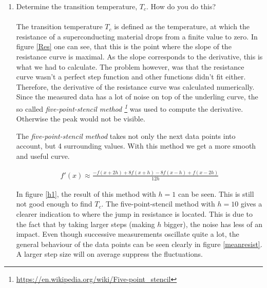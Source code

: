 \documentclass[a4paper,parskip,11pt, DIV12]{scrreprt}
\begin{document}
\begin{enumerate}
\hspace{0.1pt}

\item Determine the transition temperature, $T_c$. How do you do this?\\
\\
The transition temperature $T_c$ is defined as the temperature, at which the resistance of a superconducting material drops from a finite value to zero. In figure \ref{Res} one can see, that this is the point where the slope of the resistance curve is maximal. As the slope corresponds to the derivative, this is what we had to calculate.  The problem however, was that the resistance curve wasn't a perfect step function and other functions didn't fit either. Therefore, the derivative of the resistance curve was calculated numerically. Since the measured data has a lot of noise on top of the underling curve, the so called \emph{five-point-stencil method \footnote{\url{https://en.wikipedia.org/wiki/Five-point_stencil}}} was used to compute the derivative. Otherwise the peak would not be visible.

The \emph{five-point-stencil method} takes not only the next data points into account, but 4 surrounding values. With this method we get a more smooth and useful curve. 

\begin{align*}
f'(x) \approx \frac{-f(x+2 h)+8 f(x+h)-8 f(x-h)+f(x-2h)}{12 h}
\end{align*}

In figure \ref{h1}, the result of this method with $h = 1$ can be seen. This is still not good enough to find $T_c$. The five-point-stencil method with $h = 10$ gives a clearer indication to where the jump in resistance is located. This is due to the fact that by taking larger steps (making $h$ bigger), the noise has less of an impact. Even though successive measurements oscillate quite a lot, the general behaviour of the data points can be seen clearly in figure \ref{meanresist}. A larger step size will on average suppress the fluctuations.


\end{enumerate}
\end{document}
